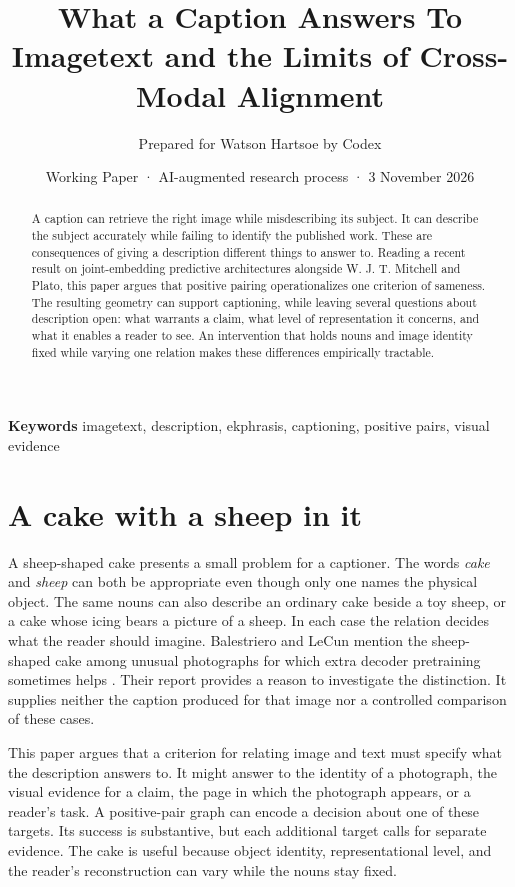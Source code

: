 \documentclass[11pt]{article}
\title{What a Caption Answers To\\\large Imagetext and the Limits of Cross-Modal Alignment}
\author{Prepared for Watson Hartsoe by Codex}
\date{Working Paper · AI-augmented research process · 3 November 2026}
\begin{document}
\maketitle
\begin{abstract}
A caption can retrieve the right image while misdescribing its subject. It can describe the subject accurately while failing to identify the published work. These are consequences of giving a description different things to answer to. Reading a recent result on joint-embedding predictive architectures alongside W. J. T. Mitchell and Plato, this paper argues that positive pairing operationalizes one criterion of sameness. The resulting geometry can support captioning, while leaving several questions about description open: what warrants a claim, what level of representation it concerns, and what it enables a reader to see. An intervention that holds nouns and image identity fixed while varying one relation makes these differences empirically tractable.
\end{abstract}
\noindent\textbf{Keywords} imagetext, description, ekphrasis, captioning, positive pairs, visual evidence

\section{A cake with a sheep in it}
A sheep-shaped cake presents a small problem for a captioner. The words \emph{cake} and \emph{sheep} can both be appropriate even though only one names the physical object. The same nouns can also describe an ordinary cake beside a toy sheep, or a cake whose icing bears a picture of a sheep. In each case the relation decides what the reader should imagine. Balestriero and LeCun mention the sheep-shaped cake among unusual photographs for which extra decoder pretraining sometimes helps \cite{balestriero2026platonic}. Their report provides a reason to investigate the distinction. It supplies neither the caption produced for that image nor a controlled comparison of these cases.

This paper argues that a criterion for relating image and text must specify what the description answers to. It might answer to the identity of a photograph, the visual evidence for a claim, the page in which the photograph appears, or a reader’s task. A positive-pair graph can encode a decision about one of these targets. Its success is substantive, but each additional target calls for separate evidence. The cake is useful because object identity, representational level, and the reader’s reconstruction can vary while the nouns stay fixed.
\end{document}
